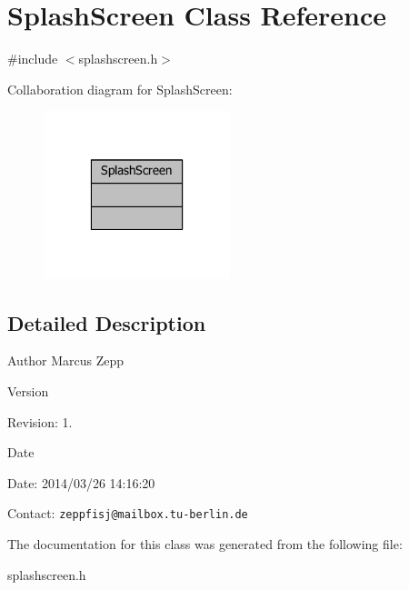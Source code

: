 \section{Splash\-Screen Class Reference}
\label{classSplashScreen}


{\ttfamily \#include $<$splashscreen.\-h$>$}



Collaboration diagram for Splash\-Screen\-:
\nopagebreak
\begin{figure}[H]
\begin{center}
\leavevmode
\includegraphics[width=154pt]{df/d98/classSplashScreen__coll__graph}
\end{center}
\end{figure}


\subsection{Detailed Description}
\begin{DoxyAuthor}{Author}
Marcus Zepp
\end{DoxyAuthor}
\begin{DoxyVersion}{Version}

\end{DoxyVersion}
\begin{DoxyParagraph}{Revision\-:}
1. 
\end{DoxyParagraph}


\begin{DoxyDate}{Date}

\end{DoxyDate}
\begin{DoxyParagraph}{Date\-:}
2014/03/26 14\-:16\-:20 
\end{DoxyParagraph}


Contact\-: {\tt zeppfisj@mailbox.\-tu-\/berlin.\-de} 

The documentation for this class was generated from the following file\-:\begin{DoxyCompactItemize}
\item 
splashscreen.\-h\end{DoxyCompactItemize}

